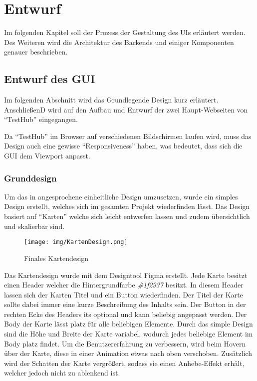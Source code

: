 \section{Entwurf}\label{sec:entwurf}
Im folgenden Kapitel soll der Prozess der Gestaltung des \gls{UI}s erläutert 
werden. Des Weiteren wird die Architektur des \gls{Backend}s und einiger Komponenten
genauer beschrieben.

\subsection{Entwurf des GUI}
Im folgenden Abschnitt wird das Grundlegende Design kurz erläutert. AnschließenD
wird auf den Aufbau und Entwurf der zwei Haupt-Webseiten von ``TestHub'' eingegangen. 

Da ``TestHub'' im Browser auf verschiedenen Bildschirmen laufen wird, muss das 
Design auch eine gewisse ``Responsiveness'' haben, was bedeutet, dass sich die 
GUI dem Viewport anpasst.

\subsubsection{Grunddesign}\label{sec:grunddesign}
Um das in  angesprochene einheitliche Design umzusetzen, 
wurde ein simples Design erstellt, welches sich im gesamten Projekt wiederfinden
lässt. Das Design basiert auf ``Karten'' welche sich leicht entwerfen lassen und
zudem übersichtlich und skalierbar sind.

\begin{figure}[H]
    \texttt{[image: img/KartenDesign.png]}
    \caption{Finales Kartendesign}\label{fig:card}
\end{figure}

Das Kartendesign wurde mit dem Designtool Figma erstellt. Jede Karte besitzt 
einen Header welcher die Hintergrundfarbe \textit{\#1f2937} besitzt. In diesem
Header lassen sich der Karten Titel und ein Button wiederfinden.
Der Titel der Karte sollte dabei immer eine kurze Beschreibung des Inhalts sein.
Der Button in der rechten Ecke des Headers its optional und kann beliebig 
angepasst werden. Der Body der Karte lässt platz für alle beliebigen Elemente.
Durch das simple Design sind die Höhe und Breite der Karte variabel, wodurch 
jedes beliebige Element im Body platz findet. Um die Benutzererfahrung zu verbessern,
wird beim Hovern über der Karte, diese in einer Animation etwas nach oben verschoben. 
Zusätzlich wird der Schatten der Karte vergrößert, sodass sie einen Anhebe-Effekt
erhält, welcher jedoch nicht zu ablenkend ist.

